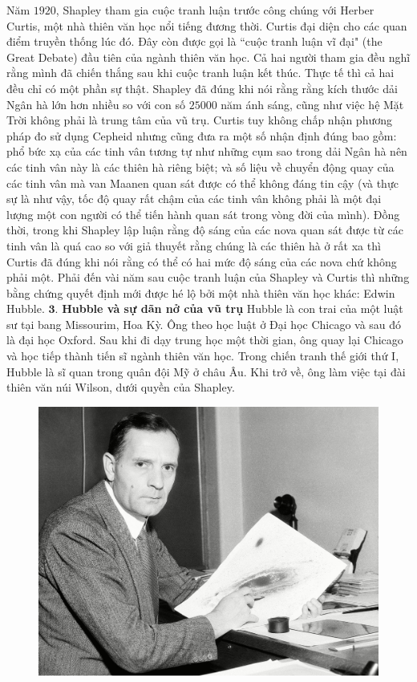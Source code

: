 \begin{multicols}{2}
	\vskip 0.1cm
	Năm $1920$, Shapley tham gia cuộc tranh luận trước công chúng với Herber Curtis, một nhà thiên văn học nổi tiếng đương thời. Curtis đại diện cho các quan điểm truyền thống lúc đó. Đây còn được gọi là ``cuộc tranh luận vĩ đại" (the Great Debate) đầu tiên của ngành thiên văn học. Cả hai người tham gia đều nghĩ rằng mình đã chiến thắng sau khi cuộc tranh luận kết thúc. Thực tế thì cả hai đều chỉ có một phần sự thật. Shapley đã đúng khi nói rằng rằng kích thước dải Ngân hà lớn hơn nhiều so với con số $25 000$ năm ánh sáng, cũng như việc hệ Mặt Trời không phải là trung tâm của vũ trụ. Curtis tuy không chấp nhận phương pháp đo sử dụng Cepheid nhưng cũng đưa ra một số nhận định đúng bao gồm: phổ bức xạ của các tinh vân tương tự như những cụm sao trong dải Ngân hà nên các tinh vân này là các thiên hà riêng biệt; và số liệu về chuyển động quay của các tinh vân mà van Maanen quan sát được có thể không đáng tin cậy (và thực sự là như vậy, tốc độ quay rất chậm của các tinh vân không phải là một đại lượng một con người có thể tiến hành quan sát trong vòng đời của mình). Đồng thời, trong khi Shapley lập luận rằng độ sáng của các nova quan sát được từ các tinh vân là quá cao so với giả thuyết rằng chúng là các thiên hà ở rất xa thì Curtis đã đúng khi nói rằng có thể có hai mức độ sáng của các nova chứ không phải một. Phải đến vài năm sau cuộc tranh luận của Shapley và Curtis thì những bằng chứng quyết định mới được hé lộ bởi một nhà thiên văn học khác: Edwin Hubble.
	\vskip 0.1cm
	$\pmb{3.}$ \textbf{\color{timhieukhoahoc}Hubble và sự dãn nở của vũ trụ}
	\vskip 0.1cm
	Hubble là con trai của một luật sư tại bang Missourim, Hoa Kỳ. Ông theo học luật ở Đại học Chicago và sau đó là đại học Oxford. Sau khi đi dạy trung học một thời gian, ông quay lại Chicago và học tiếp thành tiến sĩ ngành thiên văn học. Trong chiến tranh thế giới thứ I, Hubble là sĩ quan trong quân đội Mỹ ở châu Âu. Khi trở về, ông làm việc tại đài thiên văn núi Wilson, dưới quyền của Shapley.
	\begin{figure}[H]
		\vspace*{5pt}
		\centering
		\captionsetup{labelformat= empty, justification=centering}
		\includegraphics[width= 1\linewidth]{9}

\end{figure}
\end{multicols}
